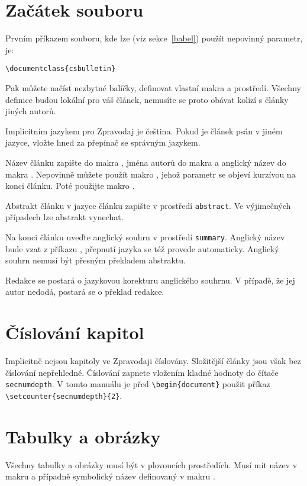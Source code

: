 \documentclass{csbulletin}
\begin{document}
\section{Začátek souboru}
Prvním příkazem souboru, kde lze (viz sekce~\ref{babel}) použít nepovinný parametr, je:

\medskip
\verb;\documentclass{csbulletin};
\medskip

Pak můžete načíst nezbytné balíčky, definovat vlastní makra a prostředí. Všechny definice budou
lokální pro váš článek, nemusíte se proto obávat kolizí s články jiných autorů.

Implicitním jazykem pro Zpravodaj je čeština. Pokud je článek psán v jiném jazyce, vložte hned za
 přepínač  se správným jazykem.

Název článku zapište do makra , jména autorů do makra  a anglický název do
makra . Nepovinně můžete použít makro , jehož parametr se objeví
kurzívou na konci článku. Poté použijte makro .

Abstrakt článku v jazyce článku zapište v prostředí \texttt{abstract}. Ve výjimečných případech lze
abstrakt vynechat.

Na konci článku uveďte anglický souhrn v prostředí \texttt{summary}. Anglický název bude vzat z
příkazu , přepnutí jazyka se též provede automaticky. Anglický souhrn nemusí být
přesným překladem abstraktu.

Redakce se postará o jazykovou korekturu anglického souhrnu. V případě, že jej autor nedodá,
postará se o překlad redakce.

\section{Číslování kapitol}
Implicitně nejsou kapitoly ve Zpravodaji číslovány. Složitější články jsou však bez číslování
nepřehledné. Číslování zapnete vložením kladné hodnoty do čítače \texttt{secnumdepth}. V tomto
manuálu je před \verb;\begin{document}; použit příkaz \verb;\setcounter{secnumdepth}{2};.

\section{Tabulky a obrázky}
Všechny
tabulky a obrázky musí být v plovoucích prostředích. Musí mít název v makru  a
případně symbolický název definovaný v makru .
\end{document}
